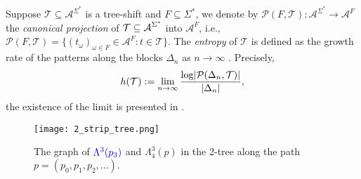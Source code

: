 \documentclass{amsart}
\theoremstyle{definition}
\begin{document}
Suppose $\mathcal{T}\subseteq \mathcal{A}%
^{\Sigma ^{\ast }}$ is a tree-shift and $F\subseteq \Sigma ^{\ast }$, we
denote by $\mathcal{P}(F,\mathcal{T}):\mathcal{A}^{\Sigma ^{\ast
}}\rightarrow \mathcal{A}^{F}$ the \emph{canonical projection }of $\mathcal{%
T\subseteq A}^{\Sigma ^{\ast }}$ into $\mathcal{A}^{F}$, i.e., $\mathcal{P}%
(F,\mathcal{T})=\{(t_{\omega})_{\omega\in F}\in \mathcal{A}^{F}: t\in 
\mathcal{T}\}$. The \emph{entropy }of $\mathcal{T}$ is defined as the growth
rate of the patterns along the blocks $\Delta _{n}$ as $n\rightarrow \infty $%
. Precisely, 
$$h(\mathcal{T}):=\lim_{n\rightarrow \infty }\frac{\log \lvert\mathcal{%
P}(\Delta_n,\mathcal{T})\rvert}{\left\vert \Delta _{n}\right\vert },$$ the existence of
the limit is presented in \cite{PS-2017complexity, petersen2020entropy}.

\begin{figure} %
	\centering %
	\texttt{[image: 2\_strip\_tree.png]} %
	\caption{The graph of ${\color{blue}\Lambda^3(p_3)}$ and $\Lambda_4^3(p)$ in the 2-tree along the path $p=(p_0,p_1,p_2,...).$ } %
	\label{2-strip tree}
\end{figure}
\end{document}
